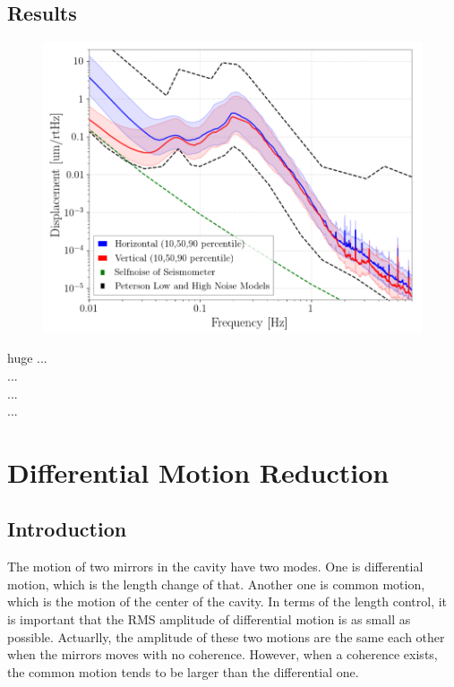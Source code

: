 \subsection{Results}
\begin{figure}[h]
  \begin{center}   
    \includegraphics[width=16.0cm]{./img_chap3/img313.png}
    \caption{}\label{img:img317}
  \end{center}
\end{figure}

huge
...\\
...\\
...\\
...\\

\section{Differential Motion Reduction} \label{sec:33}
\subsection{Introduction}
The motion of two mirrors in the cavity have two modes. One is differential motion, which is the length change of that. Another one is common motion, which is the motion of the center of the cavity. In terms of the length control, it is important that the RMS amplitude of differential motion is as small as possible. Actuarlly, the amplitude of these two motions are the same each other when the mirrors moves with no coherence. However, when a coherence exists, the common motion tends to be larger than the differential one. 

